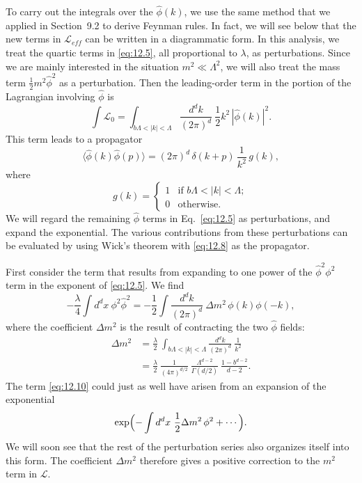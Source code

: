 To carry out the integrals over the $\hat{\phi}(k)$, we use the same method
that we applied in Section~9.2 to derive Feynman rules.  In fact, we will see
below that the new terms in $\mathcal{L}_{eff}$ can be written in a
diagrammatic form.  In this analysis, we treat the quartic terms in
\eqref{eq:12.5}, all proportional to $\lambda$, as perturbations.  Since we
are mainly interested in the situation $m^2 \ll \Lambda^2$, we will also treat
the mass term $\tfrac{1}{2}m^2\hat{\phi}^2$ as a perturbation.  Then the
leading-order term in the portion of the Lagrangian involving $\hat{\phi}$ is
\begin{equation}
  \int \mathcal{L}_0 = \int_{b\Lambda<|k|<\Lambda} \frac{d^dk}{(2\pi)^d}\
    \frac{1}{2}k^2\,|\hat{\phi}(k)|^2 .
  \label{eq:12.7}
\end{equation}
This term leads to a propagator
\begin{equation}
  \langle\hat{\phi}(k)\hat{\phi}(p)\rangle = (2\pi)^d\,\delta(k+p)\,
    \frac{1}{k^2}\,g(k) ,
  \label{eq:12.8}
\end{equation}
where
\begin{equation}
  g(k) = \begin{cases}
    1 & \text{if } b\Lambda < |k| < \Lambda;\\
    0 & \text{otherwise}.
  \end{cases}
  \label{eq:12.9}
\end{equation}
We will regard the remaining $\hat{\phi}$ terms in Eq.~\eqref{eq:12.5} as
perturbations, and expand the exponential.  The various contributions from
these perturbations can be evaluated by using Wick's theorem with
\eqref{eq:12.8} as the propagator.

First consider the term that results from expanding to one power of the
$\hat{\phi}^2\phi^2$ term in the exponent of \eqref{eq:12.5}.  We find
\begin{equation}
  -\frac{\lambda}{4}\int d^dx\ \phi^2\hat{\phi}^2 = -\frac{1}{2}\int
    \frac{d^dk}{(2\pi)^d}\ \Delta m^2\,\phi(k)\phi(-k) ,
  \label{eq:12.10}
\end{equation}
where the coefficient $\Delta m^2$ is the result of contracting the two
$\hat{\phi}$ fields:
\begin{equation}
  \begin{aligned}
    \Delta m^2 &= \frac{\lambda}{2}\ \int_{b\Lambda<|k|<\Lambda}
      \frac{d^dk}{(2\pi)^d}\ \frac{1}{k^2}\\
    &= \frac{\lambda}{2}\ \frac{1}{(4\pi)^{d/2}}\ \frac{\Lambda^{d-2}}{\Gamma(d/2)}
      \ \frac{1-b^{d-2}}{d-2} .
  \end{aligned}
  \label{eq:12.11}
\end{equation}
The term \eqref{eq:12.10} could just as well have arisen from an expansion of
the exponential
\begin{equation}
  \exp\Bigl( -\int d^dx\ \frac{1}{2}\Delta m^2\,\phi^2 + \cdots \Bigr) .
  \label{eq:12.12}
\end{equation}
We will soon see that the rest of the perturbation series also organizes
itself into this form.  The coefficient $\Delta m^2$ therefore gives a positive
correction to the $m^2$ term in $\mathcal{L}$.

